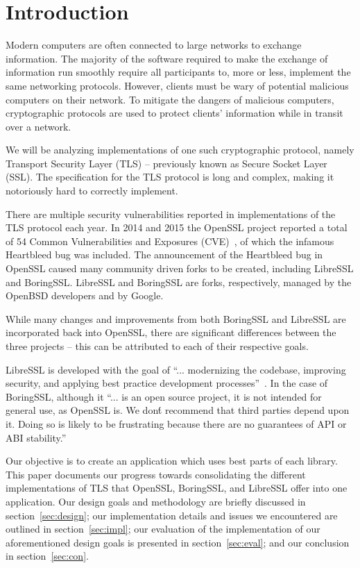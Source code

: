 \documentclass[12pt,oneside]{report}
\begin{document}
\chapter{Introduction}

Modern computers are often connected to large networks to exchange information.
The majority of the software required to make the exchange of information run
smoothly require all participants to, more or less, implement the same
networking protocols. However, clients must be wary of potential malicious
computers on their network. To mitigate the dangers of malicious computers,
cryptographic protocols are used to protect clients' information while in
transit over a network.

We will be analyzing implementations of one such cryptographic protocol, namely
Transport Security Layer (TLS) -- previously known as Secure Socket Layer (SSL).
The specification for the TLS protocol is long and complex, making it
notoriously hard to correctly implement.

There are multiple security vulnerabilities reported in implementations of the
TLS protocol each year. In 2014 and 2015 the OpenSSL project reported a total of
54 Common Vulnerabilities and Exposures (CVE)~\cite{website:opensslsec}, of
which the infamous Heartbleed bug was included. The announcement of the
Heartbleed bug in OpenSSL caused many community driven forks to be created,
including LibreSSL and BoringSSL. LibreSSL and BoringSSL are forks,
respectively, managed by the OpenBSD developers and by Google.

While many changes and improvements from both BoringSSL and LibreSSL are
incorporated back into OpenSSL, there are significant differences between the
three projects -- this can be attributed to each of their respective goals. 

LibreSSL is developed with the goal of ``... modernizing the codebase, improving
security, and applying best practice development
processes''~\cite{website:libressl}. In the case of BoringSSL, although it ``...
is an open source project, it is not intended for general use, as OpenSSL is. We
don\'t recommend that third parties depend upon it. Doing so is likely to be
frustrating because there are no guarantees of API or ABI
stability.''~\cite{website:boringssl}

Our objective is to create an application which uses best parts of each library.
This paper documents our progress towards consolidating the different
implementations of TLS that OpenSSL, BoringSSL, and LibreSSL offer into one
application. Our design goals and methodology are briefly discussed in
section~\ref{sec:design}; our implementation details and issues we encountered
are outlined in section~\ref{sec:impl}; our evaluation of the implementation of
our aforementioned design goals is presented in section~\ref{sec:eval}; and our
conclusion in section~\ref{sec:con}.
\end{document}
